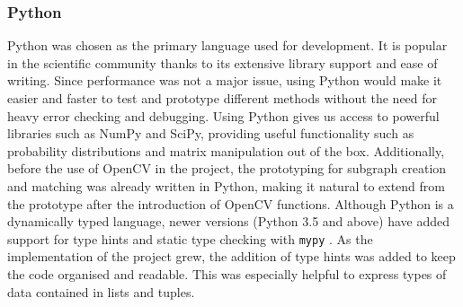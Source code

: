 \subsubsection{Python}
Python was chosen as the primary language used for development. It is popular in the scientific community thanks to its extensive library support and ease of writing. Since performance was not a major issue, using Python would make it easier and faster to test and prototype different methods without the need for heavy error checking and debugging. Using Python gives us access to powerful libraries such as NumPy and SciPy, providing useful functionality such as probability distributions and matrix manipulation out of the box. Additionally, before the use of OpenCV in the project, the prototyping for subgraph creation and matching was already written in Python, making it natural to extend from the prototype after the introduction of OpenCV functions. 
\n
Although Python is a dynamically typed language, newer versions (Python 3.5 and above) have added support for type hints and static type checking with \texttt{mypy} \cite{mypy}. As the implementation of the project grew, the addition of type hints was added to keep the code organised and readable. This was especially helpful to express types of data contained in lists and tuples. 